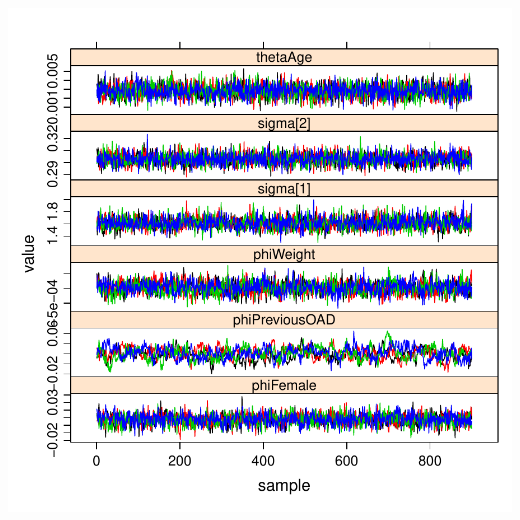 \documentclass[handout]{beamer}
\begin{document}
\begin{frame}
\begin{columns}
\includegraphics[width=\textwidth,height=0.4\textheight]{graphics/goodConvergence.pdf}
\end{columns}

\end{frame}
\end{document}
